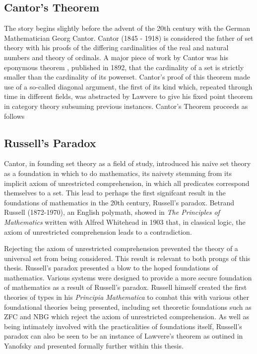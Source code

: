 \subsection{Cantor's Theorem}

The story begins slightly before the advent of the 20th century with the German
Mathematician Georg Cantor. Cantor (1845 - 1918) is considered the father of
set theory with his proofs of the differing cardinalities of the real and
natural numbers and theory of ordinals. A major piece of work by Cantor was his
eponymous theorem \cite{cantor1892ueber}, published in 1892,
that the cardinality of a set is strictly smaller than the cardinality of its
powerset. Cantor's proof of this theorem made use of a so-called diagonal
argument, the first of its kind which, repeated through time in different
fields, was abstracted by Lawvere to give his fixed point theorem in category
theory subsuming previous instances. Cantor's Theorem proceeds as follows

\subsection{Russell's Paradox}
Cantor, in founding set theory as a field of study, introduced his naive set
theory \cite{Cantor:1874} as a foundation in which to do mathematics, its
naivety stemming from its implicit axiom of unrestricted comprehension, in which
all predicates correspond themselves to a set. This lead to perhaps the first
signifcant result in the foundations of mathematics in the 20th century,
Russell's paradox. Betrand Russell (1872-1970), an English polymath, showed in
\textit{The Principles of Mathematics} \cite{russell1903principles} written with
Alfred Whitehead in 1903 that, in classical logic, the axiom of unrestricted
comprehension leads to a contradiction.


Rejecting the axiom of unrestricted comprehension prevented the theory of a
universal set from being considered.  This result is relevant to both prongs of
this thesis. Russell's paradox presented a blow to the hoped foundations of
mathematics. Various systems were designed to provide a more secure foundation
of mathematics as a result of Russell's paradox. Russell himself created the
first theories of types in his \textit{Principia Mathematica} \cite{russell25} to combat this
with various other foundational theories being presented, including set
theoretic foundations such as ZFC and NBG which reject the axiom of unrestricted
comprehension. As well as being intimately involved with the practicalities of
foundations itself, Russell's paradox can also be seen to be an instance of
Lawvere's theorem as outined in Yanofsky and presented formally further within
this thesis.

